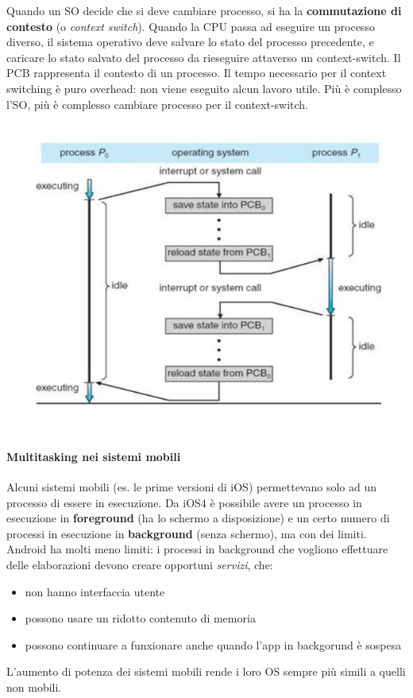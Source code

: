\documentclass[11pt]{article}
\begin{document}
Quando un SO decide che si deve cambiare processo, si ha la \textbf{commutazione di contesto} (o \textit{context switch}). Quando la CPU passa ad eseguire un processo diverso, il sistema operativo deve salvare lo stato del processo precedente, e caricare lo stato salvato del processo da rieseguire attaverso un context-switch.
Il PCB rappresenta il contesto di un processo. Il tempo necessario per il context switching è puro overhead: non viene eseguito alcun lavoro utile. Più è complesso l'SO, più è complesso cambiare processo per il context-switch.
\\ \\
\includegraphics[scale=0.7]{context-switching.png}
\\ \\ 
\paragraph{Multitasking nei sistemi mobili} Alcuni sistemi mobili (es. le prime versioni di iOS) permettevano solo ad un processo di essere in esecuzione. Da iOS4 è possibile avere un processo in esecuzione in \textbf{foreground} (ha lo schermo a disposizione) e un certo numero di processi in esecuzione in \textbf{background} (senza schermo), ma con dei limiti.
Android ha molti meno limiti: i processi in background che vogliono effettuare delle elaborazioni devono creare opportuni \textit{servizi}, che:
\begin{itemize}
\item non hanno interfaccia utente
\item possono usare un ridotto contenuto di memoria
\item possono continuare a funxionare anche quando l'app in backgorund è sospesa
\end{itemize}
L'aumento di potenza dei sistemi mobili rende i loro OS sempre più simili a quelli non mobili.
\end{document}
